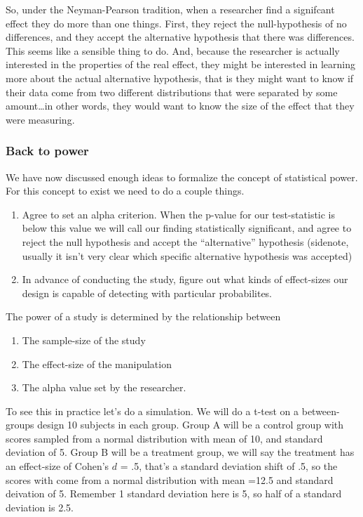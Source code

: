 \documentclass[
  letterpaper,
  DIV=11,
  numbers=noendperiod]{scrartcl}
\providecommand{\tightlist}{%
  \setlength{\itemsep}{0pt}\setlength{\parskip}{0pt}}\usepackage{longtable,booktabs,array}
\begin{document}
So, under the Neyman-Pearson tradition, when a researcher find a
signifcant effect they do more than one things. First, they reject the
null-hypothesis of no differences, and they accept the alternative
hypothesis that there was differences. This seems like a sensible thing
to do. And, because the researcher is actually interested in the
properties of the real effect, they might be interested in learning more
about the actual alternative hypothesis, that is they might want to know
if their data come from two different distributions that were separated
by some amount\ldots in other words, they would want to know the size of
the effect that they were measuring.

\hypertarget{back-to-power}{%
\subsubsection{Back to power}\label{back-to-power}}

We have now discussed enough ideas to formalize the concept of
statistical power. For this concept to exist we need to do a couple
things.

\begin{enumerate}
\def\labelenumi{\arabic{enumi}.}
\tightlist
\item
  Agree to set an alpha criterion. When the p-value for our
  test-statistic is below this value we will call our finding
  statistically significant, and agree to reject the null hypothesis and
  accept the ``alternative'' hypothesis (sidenote, usually it isn't very
  clear which specific alternative hypothesis was accepted)
\item
  In advance of conducting the study, figure out what kinds of
  effect-sizes our design is capable of detecting with particular
  probabilites.
\end{enumerate}

The power of a study is determined by the relationship between

\begin{enumerate}
\def\labelenumi{\arabic{enumi}.}
\tightlist
\item
  The sample-size of the study
\item
  The effect-size of the manipulation
\item
  The alpha value set by the researcher.
\end{enumerate}

To see this in practice let's do a simulation. We will do a t-test on a
between-groups design 10 subjects in each group. Group A will be a
control group with scores sampled from a normal distribution with mean
of 10, and standard deviation of 5. Group B will be a treatment group,
we will say the treatment has an effect-size of Cohen's \(d\) = .5,
that's a standard deviation shift of .5, so the scores with come from a
normal distribution with mean =12.5 and standard deivation of 5.
Remember 1 standard deviation here is 5, so half of a standard deviation
is 2.5.
\end{document}
